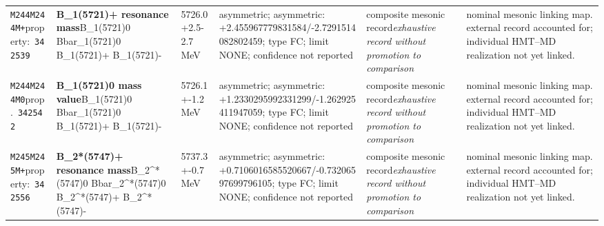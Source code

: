\begin{landscape}
\begin{longtable}{L{1.85cm}L{4.45cm}L{2.35cm}L{4.05cm}L{3.35cm}L{7.15cm}}
\texttt{M244}\newline \texttt{M244M+}\newline property:\ \texttt{342539} & \textbf{B\_\allowbreak{}1(5721)+ resonance mass}\newline B\_\allowbreak{}1(5721)0 \textbar{}\allowbreak{} Bbar\_\allowbreak{}1(5721)0 \textbar{}\allowbreak{} B\_\allowbreak{}1(5721)+ \textbar{}\allowbreak{} B\_\allowbreak{}1(5721)- & 5726.0+2.5-2.7\,MeV & asymmetric; asymmetric: +2.455967779831584/-2.7291514082802459; type FC; limit NONE; confidence not reported & composite mesonic record\newline \emph{exhaustive record without promotion to comparison} & nominal mesonic linking map. external record accounted for; individual HMT--MD realization not yet linked. \\
\texttt{M244}\newline \texttt{M244M0}\newline prop.\ \texttt{342542} & \textbf{B\_\allowbreak{}1(5721)0 mass value}\newline B\_\allowbreak{}1(5721)0 \textbar{}\allowbreak{} Bbar\_\allowbreak{}1(5721)0 \textbar{}\allowbreak{} B\_\allowbreak{}1(5721)+ \textbar{}\allowbreak{} B\_\allowbreak{}1(5721)- & 5726.1+-1.2\,MeV & asymmetric; asymmetric: +1.2330295992331299/-1.262925411947059; type FC; limit NONE; confidence not reported & composite mesonic record\newline \emph{exhaustive record without promotion to comparison} & nominal mesonic linking map. external record accounted for; individual HMT--MD realization not yet linked. \\
\texttt{M245}\newline \texttt{M245M+}\newline property:\ \texttt{342556} & \textbf{B\_\allowbreak{}2*(5747)+ resonance mass}\newline B\_\allowbreak{}2\textasciicircum{}*(5747)0 \textbar{}\allowbreak{} Bbar\_\allowbreak{}2\textasciicircum{}*(5747)0 \textbar{}\allowbreak{} B\_\allowbreak{}2\textasciicircum{}*(5747)+ \textbar{}\allowbreak{} B\_\allowbreak{}2\textasciicircum{}*(5747)- & 5737.3+-0.7\,MeV & asymmetric; asymmetric: +0.7106016585520667/-0.73206597699796105; type FC; limit NONE; confidence not reported & composite mesonic record\newline \emph{exhaustive record without promotion to comparison} & nominal mesonic linking map. external record accounted for; individual HMT--MD realization not yet linked. \\

\end{longtable}
\end{landscape}

